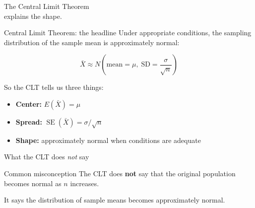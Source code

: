 \documentclass[11pt,aspectratio=169]{beamer}
\newcommand{\SE}{\operatorname{SE}}
\begin{document}
\begin{frame}[standout]
\Large The Central Limit Theorem\\explains the shape.
\end{frame}

\begin{frame}{Central Limit Theorem: the headline}
Under appropriate conditions, the sampling distribution of the sample mean is approximately normal:

\[
\boxed{
\bar{X}\approx N\!\left(\text{mean}=\mu,\;\text{SD}=\frac{\sigma}{\sqrt{n}}\right)
}
\]

So the CLT tells us three things:
\begin{itemize}
  \item \textbf{Center:} $E(\bar{X})=\mu$
  \item \textbf{Spread:} $\SE(\bar{X})=\sigma/\sqrt{n}$
  \item \textbf{Shape:} approximately normal when conditions are adequate
\end{itemize}
\end{frame}

\begin{frame}{What the CLT does \emph{not} say}
\begin{alertblock}{Common misconception}
The CLT does \textbf{not} say that the original population becomes normal as $n$ increases.
\end{alertblock}

\vspace{0.7em}
It says the distribution of \alert{sample means} becomes approximately normal.

\begin{center}
\end{center}
\end{frame}
\end{document}

